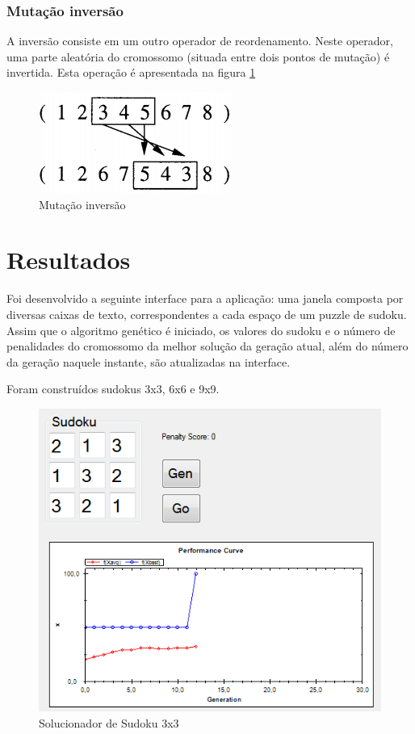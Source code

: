\documentclass[twoside]{article}
\begin{document}
\begin{multicols}{2}
\subsubsection{Mutação inversão}
A  inversão consiste em um outro operador de reordenamento. Neste operador, uma parte aleatória do cromossomo (situada entre dois pontos de mutação) é invertida. Esta operação é apresentada na figura \ref{fig:mutinv}

\begin{figure}[H]
\label{fig:mutinv}
  \caption{Mutação inversão}
  \centering
    \includegraphics[scale = 0.7]{mutation_inversion.png}
\end{figure}


\section{Resultados}

Foi desenvolvido a seguinte interface para a aplicação: uma janela composta por diversas caixas de texto, correspondentes a cada espaço de um puzzle de sudoku. Assim que o algoritmo genético é iniciado, os valores do sudoku e o número de penalidades do cromossomo da melhor solução da geração atual, além do número da geração naquele instante, são atualizadas na interface.

Foram construídos sudokus 3x3, 6x6 e 9x9.

\begin{figure}[H]
\label{fig:sudokusolver3x3}
  \caption{Solucionador de Sudoku 3x3}
  \centering
    \includegraphics[scale = 0.60]{Sudoku3x3.png}
\end{figure}


\end{multicols}
\end{document}

